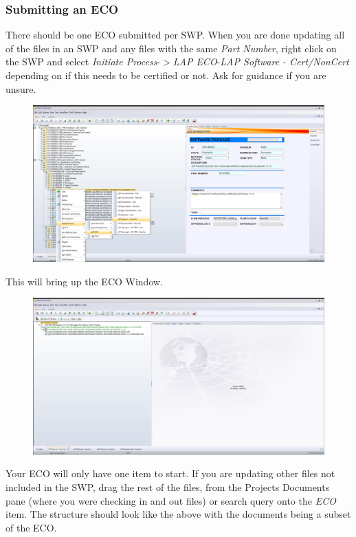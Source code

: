 \documentclass[10pt]{article}
\begin{document}
            \subsubsection{Submitting an ECO}
                There should be one ECO submitted per SWP. When you are done updating all of the files in an SWP and any files with the same \emph{Part Number}, right click on the SWP and select \emph{Initiate Process}-$>$\emph{LAP ECO}-\emph{LAP Software - Cert/NonCert} depending on if this needs to be certified or not. Ask for guidance if you are unsure.
                \begin{figure}[H]
                    \centerline{\includegraphics[width=\textwidth]{References/ST ECO Initiate Process.png}}
                \end{figure}
                This will bring up the ECO Window.
                \begin{figure}[H]
                    \centerline{\includegraphics[width=\textwidth]{References/ST ECO Window.png}}
                \end{figure}
                Your ECO will only have one item to start. If you are updating other files not included in the SWP, drag the rest of the files, from the Projects Documents pane (where you were checking in and out files) or search query onto the \emph{ECO} item. The structure should look like the above with the documents being a subset of the ECO.
\end{document}
